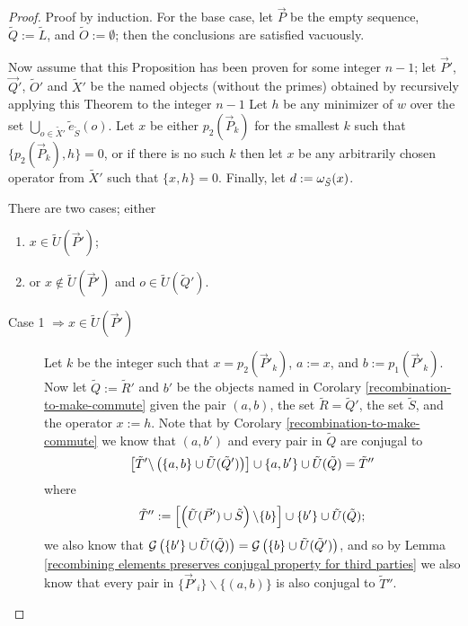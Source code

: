 \documentclass[twocolumn,showpacs,preprintnumbers,amsmath,amssymb,nofootinbib,pra,floatfix]{revtex4-1}
\newcommand{\lst}{\vec}
\newcommand{\set}{\tilde}
\newcommand{\genfun}{\mathcal{G}}
\begin{document}
\begin{proof}

Proof by induction.  For the base case, let $\lst P$ be the empty sequence, $\set Q:=\set L$, and $\set O:=\emptyset$;  then the conclusions are satisfied vacuously.

Now assume that this Proposition has been proven for some integer $n-1$;  let $\lst P'$, $\lst Q'$, $\set O'$ and $\set X'$ be the named objects (without the primes) obtained by recursively applying this Theorem to the integer $n-1$  Let $h$ be any minimizer of $w$ over the set $\bigcup_{o\in\set X'} \set e_{\set S}(o)$.  Let $x$ be either $p_2(\lst P_k)$ for the smallest $k$ such that $\{p_2(\lst P_k),h\}=0$, or if there is no such $k$ then let $x$ be any arbitrarily chosen operator from $\set X'$ such that $\{x,h\}=0$.  Finally, let  $d:=\om_{\set S}(x)$.

There are two cases;  either
\begin{enumerate}
\item $x\in \set U(\lst P')$;
\item or $x\notin \set U(\lst P')$ and $o\in\set U(\set Q')$.
\end{enumerate}

\begin{description}

\item[Case 1 $\Rightarrow x\in\set U(\lst P')$]
Let $k$ be the integer such that $x=p_2(\lst P'_k)$, $a := x$, and $b:=p_1(\lst P'_k)$.  Now let $\set Q:=\set R'$ and $b'$ be the objects named in Corolary \ref{recombination-to-make-commute} given the pair $(a,b)$, the set $\set R=\set Q'$, the set $\set S$, and the operator $x:=h$.  Note that by Corolary \ref{recombination-to-make-commute} we know that $(a,b')$ and every pair in $\set Q$ are conjugal to
$$\left[\set T'\backslash\paren{\{a,b\} \cup \set U(\set Q')}\right]\cup \{a,b'\} \cup \set U(\set Q)=\set T''$$
where
$$\set T'':=\left[\paren{\set U(\lst P')\cup \set S}\backslash\{b\}\right]\cup \{b'\} \cup \set U(\set Q);$$
we also know that $\genfun\paren{\{b'\}\cup \set U(\set Q)}=\genfun\paren{\{b\}\cup \set U(\set Q')}$, and so by Lemma \ref{recombining elements preserves conjugal property for third parties} we also know that every pair in $\{\lst P'_i\}\backslash\{(a,b)\}$ is also conjugal to $\set T''$.


\end{description}
\end{proof}
\end{document}
